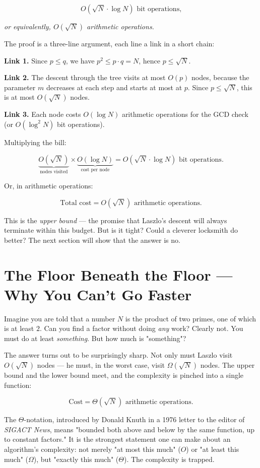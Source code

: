\documentclass[11pt,twoside,openright]{book}
\theoremstyle{definition}
\theoremstyle{remark}
\begin{document}
\[O\!\left(\sqrt{N} \cdot \log N\right) \text{ bit operations,}\]

\textit{or equivalently, $O(\sqrt{N})$ arithmetic operations.}

The proof is a three-line argument, each line a link in a short chain:

\textbf{Link 1.} Since $p \le q$, we have $p^2 \le p \cdot q = N$, hence $p \le \sqrt{N}$.

\textbf{Link 2.} The descent through the tree visits at most $O(p)$ nodes, because the parameter $m$ decreases at each step and starts at most at $p$. Since $p \le \sqrt{N}$, this is at most $O(\sqrt{N})$ nodes.

\textbf{Link 3.} Each node costs $O(\log N)$ arithmetic operations for the GCD check (or $O(\log^2 N)$ bit operations).

Multiplying the bill:

\[\underbrace{O(\sqrt{N})}_{\text{nodes visited}} \times \underbrace{O(\log N)}_{\text{cost per node}} = O(\sqrt{N} \cdot \log N) \text{ bit operations.}\]

Or, in arithmetic operations:

\[\boxed{\text{Total cost} = O\!\left(\sqrt{N}\right) \text{ arithmetic operations.}}\]

This is the \textit{upper bound} --- the promise that Laszlo's descent will always terminate within this budget. But is it tight? Could a cleverer locksmith do better? The next section will show that the answer is no.




\section{The Floor Beneath the Floor --- Why You Can't Go Faster}

Imagine you are told that a number $N$ is the product of two primes, one of which is at least $2$. Can you find a factor without doing \textit{any} work? Clearly not. You must do at least \textit{something}. But how much is "something"?

The answer turns out to be surprisingly sharp. Not only must Laszlo visit $O(\sqrt{N})$ nodes --- he must, in the worst case, visit $\Omega(\sqrt{N})$ nodes. The upper bound and the lower bound meet, and the complexity is pinched into a single function:

\[\text{Cost} = \Theta(\sqrt{N}) \text{ arithmetic operations.}\]

The $\Theta$-notation, introduced by Donald Knuth in a 1976 letter to the editor of \textit{SIGACT News}, means "bounded both above and below by the same function, up to constant factors." It is the strongest statement one can make about an algorithm's complexity: not merely "at most this much" ($O$) or "at least this much" ($\Omega$), but "exactly this much" ($\Theta$). The complexity is trapped.
\end{document}
